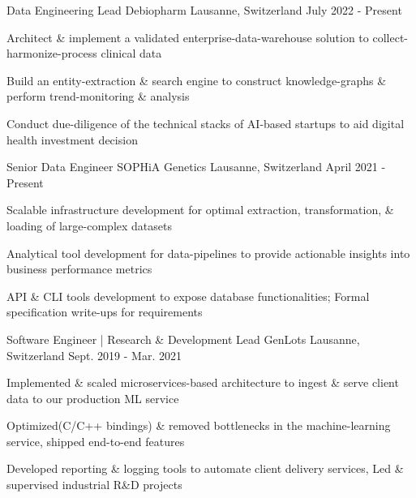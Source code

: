 

\begin{cventries}

\vspace{-0.2cm}
 \cventry
    {Data Engineering Lead} %
    {Debiopharm} %
    {Lausanne, Switzerland} %
    {July 2022 - Present} %
    {
      \begin{cvitems} %
        \item {Architect \& implement a validated enterprise-data-warehouse solution to collect-harmonize-process clinical data}
        \item {Build an entity-extraction \& search engine to construct knowledge-graphs \& perform trend-monitoring \& analysis}
        \item {Conduct due-diligence of the technical stacks of AI-based startups to aid digital health investment decision}
      \end{cvitems}
    }

	
 \cventry
    {Senior Data Engineer} %
    {SOPHiA Genetics} %
    {Lausanne, Switzerland} %
    {April 2021 - Present} %
    {
      \begin{cvitems} %
        \item {Scalable infrastructure development for optimal extraction, transformation, \& loading of large-complex datasets}
        \item {Analytical tool development for data-pipelines to provide actionable insights into business performance metrics}
        \item {API \& CLI tools development to expose database functionalities; Formal specification write-ups for requirements}
      \end{cvitems}
    }

  \cventry
    {Software Engineer | Research \& Development Lead} %
    {GenLots} %
    {Lausanne, Switzerland} %
    {Sept. 2019 - Mar. 2021} %
    {
      \begin{cvitems} %
      	\item {Implemented \& scaled microservices-based architecture to ingest \& serve client data to our production ML service}
      	\item {Optimized(C/C++ bindings) \& removed bottlenecks in the machine-learning service, shipped end-to-end features}
        \item {Developed reporting \& logging tools to automate client delivery services, Led \& supervised industrial R\&D projects}
      \end{cvitems}
    } 
   


\end{cventries}
